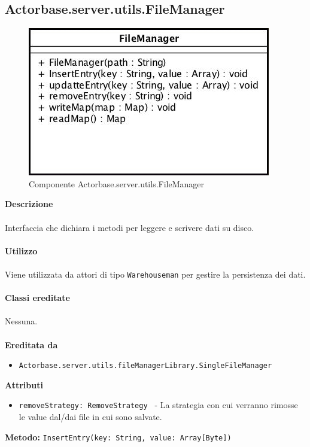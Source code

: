 \documentclass[a4paper]{article}
\begin{document}
		\subsection{Actorbase.server.utils.FileManager}
		\begin{figure}[H]
			\centering
			\includegraphics[scale = 0.6]{Server/fmClass.jpg}
			\caption{Componente Actorbase.server.utils.FileManager}
		\end{figure}
		\textbf{Descrizione}
			\\ \\
			Interfaccia che dichiara i metodi per leggere e scrivere dati su disco.
			\\ \\
		\textbf{Utilizzo}
			\\ \\
			Viene utilizzata da attori di tipo \texttt{Warehouseman} per gestire la persistenza dei dati.
			\\ \\
		\textbf{Classi ereditate}
			\\ \\
			Nessuna.
			\\ \\
		\textbf{Ereditata da}
			\begin{itemize}
				\item \texttt{Actorbase.server.utils.fileManagerLibrary.SingleFileManager}
			\end{itemize}
		\textbf{Attributi}
			\begin{itemize}
				\item \texttt{removeStrategy: RemoveStrategy } - La strategia con cui verranno rimosse le value dal/dai file in cui sono salvate.
			\end{itemize}
		\textbf{Metodo:} \texttt{InsertEntry(key: String, value: Array[Byte])}
		\\ \\
\end{document}
